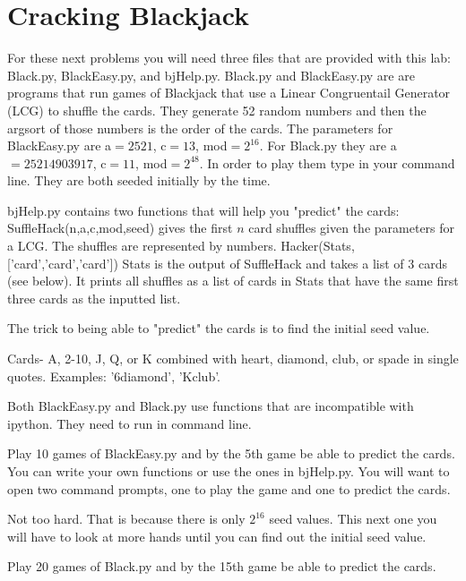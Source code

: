 \section*{Cracking Blackjack}
For these next problems you will need three files that are provided with this lab: Black.py, BlackEasy.py, and bjHelp.py.
Black.py and BlackEasy.py are are programs that run games of Blackjack that use a Linear Congruentail Generator (LCG) to shuffle the cards.
They generate 52 random numbers and then the argsort of those numbers is the order of the cards.
The parameters for BlackEasy.py are a$=2521$, c$=13$, mod$=2^{16}$.
For Black.py they are a$=25214903917$, c$=11$, mod$=2^{48}$.
In order to play them type  in your command line.
They are both seeded initially by the time.

bjHelp.py contains two functions that will help you "predict" the cards:
SuffleHack(n,a,c,mod,seed) gives the first $n$ card shuffles given the parameters for a LCG.
The shuffles are represented by numbers.
Hacker(Stats,['card','card','card']) Stats is the output of SuffleHack and takes a list of 3 cards (see below).
It prints all shuffles as a list of cards in Stats that have the same first three cards as the inputted list.

The trick to being able to "predict" the cards is to find the initial seed value.

Cards- A, 2-10, J, Q, or K combined with heart, diamond, club, or spade in single quotes.
Examples: '6diamond', 'Kclub'.

\begin{warn}
Both BlackEasy.py and Black.py use functions that are incompatible with ipython. They need to run  in command line.
\end{warn}



\begin{problem}
Play 10 games of BlackEasy.py and by the 5th game be able to predict the cards.
You can write your own functions or use the ones in bjHelp.py.
You will want to open two command prompts, one to play the game and one to predict the cards. 
\end{problem}

Not too hard.
That is because there is only $2^{16}$ seed values.
This next one you will have to look at more hands until you can find out the initial seed value.

\begin{problem}
Play 20 games of Black.py and by the 15th game be able to predict the cards.
\end{problem}



